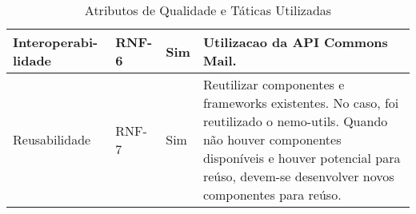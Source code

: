 \begin{table}[h]
\begin{tabular}{|p{2.5cm}|p{2cm}|p{1.9cm}|p{8.4cm}|}
	
		Interoperabi- lidade & RNF-6 & Sim  & Utilizacao da API Commons Mail. \\\hline 
		
		
		Reusabilidade & RNF-7 & Sim  & Reutilizar componentes e frameworks existentes. No caso, foi reutilizado o nemo-utils. Quando não houver componentes disponíveis e houver potencial para reúso, devem-se desenvolver novos componentes para reúso. \\\hline  
 		 
		                              
	\end{tabular}
	\caption{Atributos de Qualidade e Táticas Utilizadas}	
	\label{tabela-atributos}
\end{table}
